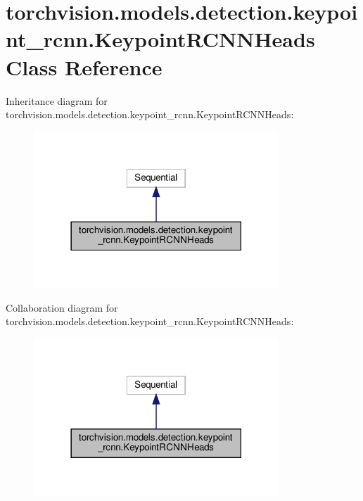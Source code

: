 \hypertarget{classtorchvision_1_1models_1_1detection_1_1keypoint__rcnn_1_1KeypointRCNNHeads}{}\section{torchvision.\+models.\+detection.\+keypoint\+\_\+rcnn.\+Keypoint\+R\+C\+N\+N\+Heads Class Reference}
\label{classtorchvision_1_1models_1_1detection_1_1keypoint__rcnn_1_1KeypointRCNNHeads}


Inheritance diagram for torchvision.\+models.\+detection.\+keypoint\+\_\+rcnn.\+Keypoint\+R\+C\+N\+N\+Heads\+:
\nopagebreak
\begin{figure}[H]
\begin{center}
\leavevmode
\includegraphics[width=261pt]{classtorchvision_1_1models_1_1detection_1_1keypoint__rcnn_1_1KeypointRCNNHeads__inherit__graph}
\end{center}
\end{figure}


Collaboration diagram for torchvision.\+models.\+detection.\+keypoint\+\_\+rcnn.\+Keypoint\+R\+C\+N\+N\+Heads\+:
\nopagebreak
\begin{figure}[H]
\begin{center}
\leavevmode
\includegraphics[width=261pt]{classtorchvision_1_1models_1_1detection_1_1keypoint__rcnn_1_1KeypointRCNNHeads__coll__graph}
\end{center}
\end{figure}
